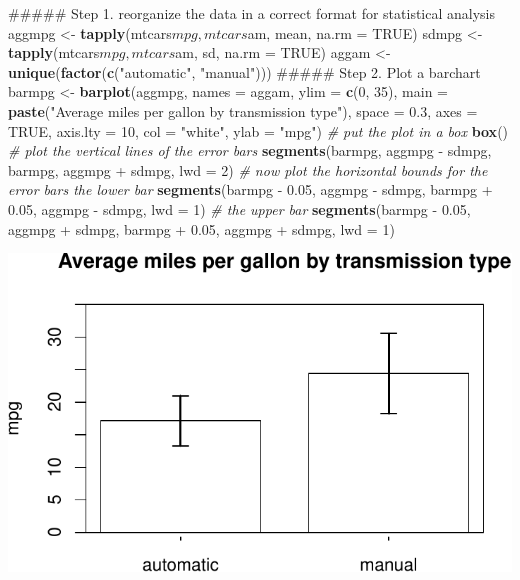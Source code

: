 \documentclass[]{article}
\newenvironment{Shaded}{\begin{snugshade}}{\end{snugshade}}
\newcommand{\KeywordTok}[1]{\textcolor[rgb]{0.13,0.29,0.53}{\textbf{{#1}}}}
\newcommand{\DataTypeTok}[1]{\textcolor[rgb]{0.13,0.29,0.53}{{#1}}}
\newcommand{\DecValTok}[1]{\textcolor[rgb]{0.00,0.00,0.81}{{#1}}}
\newcommand{\FloatTok}[1]{\textcolor[rgb]{0.00,0.00,0.81}{{#1}}}
\newcommand{\StringTok}[1]{\textcolor[rgb]{0.31,0.60,0.02}{{#1}}}
\newcommand{\CommentTok}[1]{\textcolor[rgb]{0.56,0.35,0.01}{\textit{{#1}}}}
\newcommand{\OtherTok}[1]{\textcolor[rgb]{0.56,0.35,0.01}{{#1}}}
\newcommand{\NormalTok}[1]{{#1}}
\numberwithin{equation}{section}
\begin{document}
\begin{Shaded}
\begin{Highlighting}[]
\NormalTok{##### Step 1. reorganize the data in a correct format for statistical analysis}
\NormalTok{aggmpg <-}\StringTok{ }\KeywordTok{tapply}\NormalTok{(mtcars$mpg, mtcars$am, mean, }\DataTypeTok{na.rm =} \OtherTok{TRUE}\NormalTok{)}
\NormalTok{sdmpg <-}\StringTok{ }\KeywordTok{tapply}\NormalTok{(mtcars$mpg, mtcars$am, sd, }\DataTypeTok{na.rm =} \OtherTok{TRUE}\NormalTok{)}
\NormalTok{aggam <-}\StringTok{ }\KeywordTok{unique}\NormalTok{(}\KeywordTok{factor}\NormalTok{(}\KeywordTok{c}\NormalTok{(}\StringTok{"automatic"}\NormalTok{, }\StringTok{"manual"}\NormalTok{)))}
\NormalTok{##### Step 2. Plot a barchart}
\NormalTok{barmpg <-}\StringTok{ }\KeywordTok{barplot}\NormalTok{(aggmpg, }\DataTypeTok{names =} \NormalTok{aggam, }\DataTypeTok{ylim =} \KeywordTok{c}\NormalTok{(}\DecValTok{0}\NormalTok{, }\DecValTok{35}\NormalTok{), }\DataTypeTok{main =} \KeywordTok{paste}\NormalTok{(}\StringTok{"Average miles per gallon by transmission type"}\NormalTok{), }
    \DataTypeTok{space =} \FloatTok{0.3}\NormalTok{, }\DataTypeTok{axes =} \OtherTok{TRUE}\NormalTok{, }\DataTypeTok{axis.lty =} \DecValTok{10}\NormalTok{, }\DataTypeTok{col =} \StringTok{"white"}\NormalTok{, }\DataTypeTok{ylab =} \StringTok{"mpg"}\NormalTok{)}
\CommentTok{# put the plot in a box}
\KeywordTok{box}\NormalTok{()}
\CommentTok{# plot the vertical lines of the error bars}
\KeywordTok{segments}\NormalTok{(barmpg, aggmpg -}\StringTok{ }\NormalTok{sdmpg, barmpg, aggmpg +}\StringTok{ }\NormalTok{sdmpg, }\DataTypeTok{lwd =} \DecValTok{2}\NormalTok{)}
\CommentTok{# now plot the horizontal bounds for the error bars the lower bar}
\KeywordTok{segments}\NormalTok{(barmpg -}\StringTok{ }\FloatTok{0.05}\NormalTok{, aggmpg -}\StringTok{ }\NormalTok{sdmpg, barmpg +}\StringTok{ }\FloatTok{0.05}\NormalTok{, aggmpg -}\StringTok{ }\NormalTok{sdmpg, }\DataTypeTok{lwd =} \DecValTok{1}\NormalTok{)}
\CommentTok{# the upper bar}
\KeywordTok{segments}\NormalTok{(barmpg -}\StringTok{ }\FloatTok{0.05}\NormalTok{, aggmpg +}\StringTok{ }\NormalTok{sdmpg, barmpg +}\StringTok{ }\FloatTok{0.05}\NormalTok{, aggmpg +}\StringTok{ }\NormalTok{sdmpg, }\DataTypeTok{lwd =} \DecValTok{1}\NormalTok{)}
\end{Highlighting}
\end{Shaded}

\includegraphics{tema5_files/figure-latex/unnamed-chunk-22-1.pdf}
\end{document}
